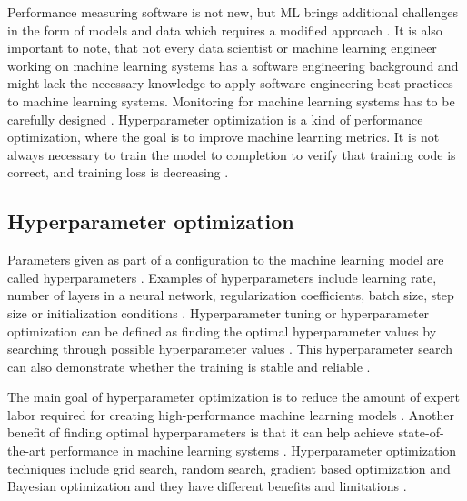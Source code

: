 Performance measuring software is not new, but ML brings additional challenges in the form of models and data which requires a modified approach \parencite{breckMLTestScore2017a}. It is also important to note, that not every data scientist or machine learning engineer working on machine learning systems has a software engineering background \parencite{finzerDataScienceEducation2013} and might lack the necessary knowledge to apply software engineering best practices to machine learning systems. Monitoring for machine learning systems has to be carefully designed \parencite{sculleyHiddenTechnicalDebt2015a}. Hyperparameter optimization is a kind of performance optimization, where the goal is to improve machine learning metrics. It is not always necessary to train the model to completion to verify that training code is correct, and training loss is decreasing \parencite{breckMLTestScore2017a}.


\subsection{Hyperparameter optimization}


Parameters given as part of a configuration to the machine learning model are called hyperparameters \parencite{yangHyperparameterOptimizationMachine2020}. Examples of hyperparameters include learning rate, number of layers in a neural network, regularization coefficients, batch size, step size or initialization conditions \parencite{maclaurinGradientbasedHyperparameterOptimization2015,bakerAcceleratingNeuralArchitecture2017,breckMLTestScore2017a}. Hyperparameter tuning or hyperparameter optimization can be defined as finding the optimal hyperparameter values by searching through possible hyperparameter values \parencite{bakerAcceleratingNeuralArchitecture2017}. This hyperparameter search can also demonstrate whether the training is stable and reliable \parencite{breckMLTestScore2017a}.

The main goal of hyperparameter optimization is to reduce the amount of expert labor required for creating high-performance machine learning models \parencite{bakerAcceleratingNeuralArchitecture2017}.
Another benefit of finding optimal hyperparameters is that it can help achieve state-of-the-art performance in machine learning systems \parencite{maclaurinGradientbasedHyperparameterOptimization2015}.
Hyperparameter optimization techniques include grid search, random search, gradient based optimization and Bayesian optimization and they have different benefits and limitations \parencite{yangHyperparameterOptimizationMachine2020}.

